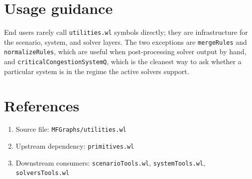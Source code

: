 \documentclass[11pt]{article}
\begin{document}
\section{Usage guidance}

End users rarely call \texttt{utilities.wl} symbols directly; they are infrastructure for the scenario, system, and solver layers. The two exceptions are \texttt{mergeRules} and \texttt{normalizeRules}, which are useful when post-processing solver output by hand, and \texttt{criticalCongestionSystemQ}, which is the cleanest way to ask whether a particular system is in the regime the active solvers support.

\section*{References}

\begin{enumerate}
\item Source file: \texttt{MFGraphs/utilities.wl}
\item Upstream dependency: \texttt{primitives.wl}
\item Downstream consumers: \texttt{scenarioTools.wl}, \texttt{systemTools.wl}, \texttt{solversTools.wl}
\end{enumerate}
\end{document}
